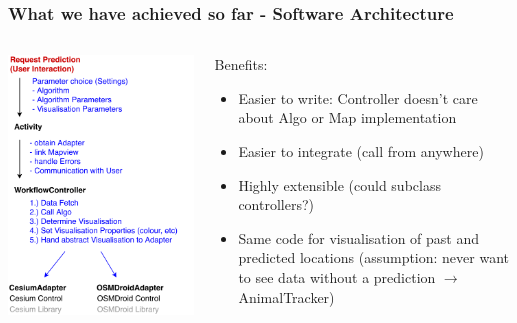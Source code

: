 \documentclass[xcolor=dvipsnames]{beamer}
\begin{document}
\begin{frame}
	\frametitle{What we have achieved so far - Software Architecture}
	\begin{columns}
	\begin{column}{0.5\textwidth}
		\includegraphics[width=\textwidth]{diagrams/controller-flow.pdf}
	\end{column}
	\begin{column}{0.5\textwidth}
		\fontsize{9pt}{9}\selectfont
		Benefits:
		\begin{itemize} 
		 	 \item Easier to write: Controller doesn't care about Algo or Map implementation
		 	 \item Easier to integrate (call from anywhere)
		 	 \item Highly extensible (could subclass controllers?)
		 	 \item Same code for visualisation of past and predicted locations {\tiny(assumption: never want to see data without a prediction $\rightarrow$ AnimalTracker)}
		\end{itemize} 
 	\end{column}
	\end{columns}
\end{frame}
\end{document}
